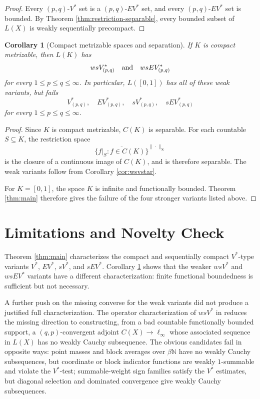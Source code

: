 \documentclass[11pt]{article}
\newtheorem{corollary}{Corollary}
\newcommand{\N}{\mathbb N}
\newcommand{\Vstar}{V^\ast}
\newcommand{\EVstar}{EV^\ast}
\begin{document}
\begin{proof}
Every \((p,q)\)-\(\Vstar\) set is a \((p,q)\)-\(\EVstar\) set, and every
\((p,q)\)-\(\EVstar\) set is bounded. By Theorem
\ref{thm:restriction-separable}, every bounded subset of \(L(X)\) is
weakly sequentially precompact.
\end{proof}

\begin{corollary}[Compact metrizable spaces and separation]
\label{cor:interval-separation}
If \(K\) is compact metrizable, then \(L(K)\) has
\[
  ws\Vstar_{(p,q)}
  \quad\hbox{and}\quad
  ws\EVstar_{(p,q)}
\]
for every \(1\le p\le q\le\infty\). In particular, \(L([0,1])\) has all
of these weak variants, but fails
\[
  \Vstar_{(p,q)},\quad \EVstar_{(p,q)},\quad
  s\Vstar_{(p,q)},\quad s\EVstar_{(p,q)}
\]
for every \(1\le p\le q\le\infty\).
\end{corollary}

\begin{proof}
Since \(K\) is compact metrizable, \(C(K)\) is separable. For each
countable \(S\subseteq K\), the restriction space
\[
  \overline{\{f|_S:f\in C(K)\}}^{\|\cdot\|_\infty}
\]
is the closure of a continuous image of \(C(K)\), and is therefore
separable. The weak variants follow from Corollary \ref{cor:wsvstar}.

For \(K=[0,1]\), the space \(K\) is infinite and functionally bounded.
Theorem \ref{thm:main} therefore gives the failure of the four stronger
variants listed above.
\end{proof}

\section*{Limitations and Novelty Check}

Theorem \ref{thm:main} characterizes the compact and sequentially compact
\(V^\ast\)-type variants \(V^\ast\), \(EV^\ast\), \(sV^\ast\), and
\(sEV^\ast\). Corollary \ref{cor:interval-separation} shows that the
weaker \(wsV^\ast\) and \(wsEV^\ast\) variants have a different
characterization: finite functional boundedness is sufficient but not
necessary.

A further push on the missing converse for the weak variants did not
produce a justified full characterization. The operator characterization
of \(wsV^\ast\) in \cite{Gab2024Pel} reduces the missing direction to
constructing, from a bad countable functionally bounded support, a
\((q,p)\)-convergent adjoint \(C(X)\to\ell_\infty\) whose associated
sequence in \(L(X)\) has no weakly Cauchy subsequence. The obvious
candidates fail in opposite ways: point masses and block averages over
\(\beta\N\) have no weakly Cauchy subsequences, but coordinate or block
indicator functions are weakly \(1\)-summable and violate the
\(V^\ast\)-test; summable-weight sign families satisfy the \(V^\ast\)
estimates, but diagonal selection and dominated convergence give weakly
Cauchy subsequences.
\end{document}
